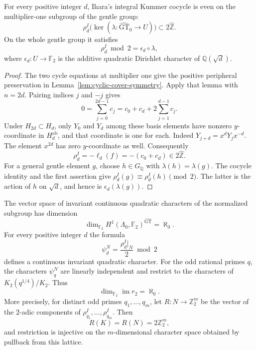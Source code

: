 \begin{theorem}\label{thm:all-kummer-parity}
For every positive integer $d$, Ihara's integral Kummer cocycle is even
on the multiplier-one subgroup of the gentle group:
\[
 \rho_d^I\bigl(\ker(\lambda:\widehat{\mathrm{GT}}_0\to U)\bigr)
       \subset2\widehat{\mathbb Z}.
\]
On the whole gentle group it satisfies
\[
 \rho_d^I\bmod2=\epsilon_d\circ\lambda,
\]
where $\epsilon_d:U\to\mathbb F_2$ is the additive quadratic
Dirichlet character of $\mathbb Q(\sqrt d)$.
\end{theorem}

\begin{proof}
The two cycle equations at multiplier one give the positive peripheral
preservation in Lemma~\ref{lem:cyclic-cover-symmetry}. Apply that lemma
with $n=2d$. Pairing indices $j$ and $-j$ gives
\[
 0=\sum_{j=0}^{2d-1}c_j
   =c_0+c_d+2\sum_{j=1}^{d-1}c_j.
\]
Under $H_{2d}\subset H_d$, only $Y_0$ and $Y_d$ among these basis
elements have nonzero $y$-coordinate in $H_d^{\mathrm{ab}}$, and that
coordinate is one for each. Indeed $Y_{j+d}=x^dY_jx^{-d}$.
The element $x^{2d}$ has zero $y$-coordinate as well. Consequently
\[
 \rho_d^I=-\ell_d(f)=-(c_0+c_d)\in2\widehat{\mathbb Z}.
\]
For a general gentle element $g$, choose $h\in G_{\mathbb Q}$ with
$\lambda(h)=\lambda(g)$. The cocycle identity and the first assertion
give $\rho_d^I(g)\equiv\rho_d^I(h)\pmod2$. The latter is the action
of $h$ on $\sqrt d$, and hence is $\epsilon_d(\lambda(g))$.
\end{proof}

\begin{theorem}\label{thm:quadratic-dimension}
The vector space of invariant continuous quadratic characters of the
normalized subgroup has dimension
\[
 \dim_{\mathbb F_2}H^1(\Lambda_0,\mathbb F_2)^{\widehat{\mathrm{GT}}}
 =\aleph_0.
\]
For every positive integer $d$ the formula
\[
 \psi_d^N=\frac{\rho_d^I|_N}{2}\bmod2
\]
defines a continuous invariant quadratic character. For the odd rational
primes $q$, the characters $\psi_q^N$ are linearly independent and
restrict to the characters of $K_2(q^{1/4})/K_2$. Thus
\[
 \dim_{\mathbb F_2}\operatorname{im}r_2=\aleph_0.
\]
More precisely, for distinct odd primes $q_1,\ldots,q_m$, let
$R:N\to\mathbb Z_2^m$ be the vector of the $2$-adic components of
$\rho_{q_1}^I,\ldots,\rho_{q_m}^I$. Then
\[
 R(K)=R(N)=2\mathbb Z_2^m,
\]
and restriction is injective on the $m$-dimensional character space
obtained by pullback from this lattice.
\end{theorem}


